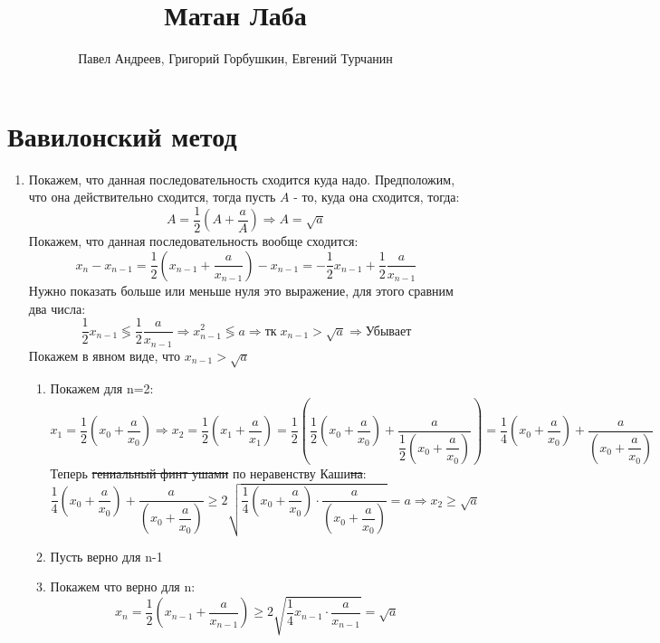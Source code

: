 \documentclass{report}
\title{\Huge{Матан Лаба}}
\author{\huge{Павел Андреев, Григорий Горбушкин, Евгений Турчанин}}
\date{}
\begin{document}
\maketitle

\section{\textbf{Вавилонский метод}}
\begin{enumerate}
	\item Покажем, что данная последовательность сходится куда надо.
	Предположим, что она действительно сходится, тогда пусть $A$ - то, куда она сходится, тогда:
	\begin{equation*}
	A=\frac{1}{2}\left(A+\dfrac{a}{A}\right)\Rightarrow A=\sqrt{a}
	\end{equation*}
	Покажем, что данная последовательность вообще сходится:
	\begin{equation*}
		x_n-x_{n-1}=\frac{1}{2}\left(x_{n-1}+\dfrac{a}{x_{n-1}}\right)-x_{n-1}=-\frac{1}{2}x_{n-1}+\frac{1}{2}\dfrac{a}{x_{n-1}}
	\end{equation*}
	Нужно показать больше или меньше нуля это выражение, для этого сравним два числа:
	\begin{equation*}
		\frac{1}{2}x_{n-1}\lessgtr\frac{1}{2}\dfrac{a}{x_{n-1}}\Rightarrow x_{n-1}^2\lessgtr a \Rightarrow \text{тк}\;x_{n-1}>\sqrt{a} \Rightarrow \text{Убывает}
	\end{equation*}
	Покажем в явном виде, что $x_{n-1}>\sqrt{a}$
	\begin{enumerate}
		\item Покажем для n=2:
			\begin{equation*}
				x_1=\frac{1}{2}\left(x_{0}+\dfrac{a}{x_{0}}\right) \Rightarrow
				x_2=\frac{1}{2}\left(x_{1}+\dfrac{a}{x_{1}}\right)=\frac{1}{2}\left(\frac{1}{2}\left(x_{0}+\dfrac{a}{x_{0}}\right)+\dfrac{a}{\dfrac{1}{2}\left(x_{0}+\dfrac{a}{x_{0}}\right)}\right)=
				\frac{1}{4}\left(x_0+\dfrac{a}{x_0}\right)+\dfrac{a}{\left(x_0+\dfrac{a}{x_0}\right)}
			\end{equation*}
			Теперь \sout{гениальный финт ушами} по неравенству Каши\sout{на}:
			\begin{equation*}
				\frac{1}{4}\left(x_0+\dfrac{a}{x_0}\right)+\dfrac{a}{\left(x_0+\dfrac{a}{x_0}\right)}\geq 2\sqrt{\frac{1}{4}\left(x_0+\dfrac{a}{x_0}\right)\cdot\dfrac{a}{\left(x_0+\dfrac{a}{x_0}\right)}}=a\Rightarrow x_2\geq \sqrt{a}
			\end{equation*}
		\item Пусть верно для n-1
		\item Покажем что верно для n:
			\begin{equation*}
				x_n=\frac{1}{2}\left(x_{n-1}+\dfrac{a}{x_{n-1}}\right) \geq 2\sqrt{\frac{1}{4}x_{n-1}\cdot\dfrac{a}{x_{n-1}}}=\sqrt{a}
			\end{equation*}


\end{enumerate}
\end{enumerate}
\end{document}
